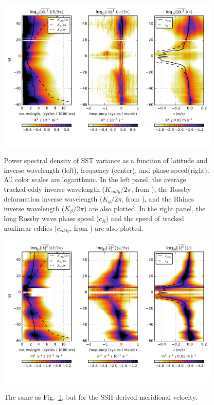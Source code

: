 \documentclass[10pt]{article}
\begin{document}
\begin{figure}[t]
  \noindent\includegraphics{../figures/SAT_50degwide/integrated_spectra_T.pdf}\\
  \caption{Power spectral density of SST variance as a function of latitude and inverse wavelength (left), frequency (center), and phase speed(right). All color scales are logarithmic. In the left panel, the average tracked-eddy inverse wavelength ($K_{eddy}/2\pi$, from \citealt{CheltonEtAl2011}), the Rossby deformation inverse wavelength ($K_d/2\pi$, from \citealt{TullochEtAl2009}), and the Rhines inverse wavelength ($K_{\beta} / 2\pi$) are also plotted. In the right panel, the long Rossby wave phase speed ($c_R$) and the speed of tracked nonlinear eddies ($c_{eddy}$, from \citealt{CheltonEtAl2011}) are also plotted.}
  \label{fig:integrated_spectra_T}
\end{figure}

\begin{figure}[t]
  \noindent\includegraphics{../figures/SAT_50degwide/integrated_spectra_V.pdf}\\
  \caption{The same as Fig.~\ref{fig:integrated_spectra_T}, but for the SSH-derived meridional velocity.}
  \label{fig:integrated_spectra_V}
\end{figure}
\end{document}
